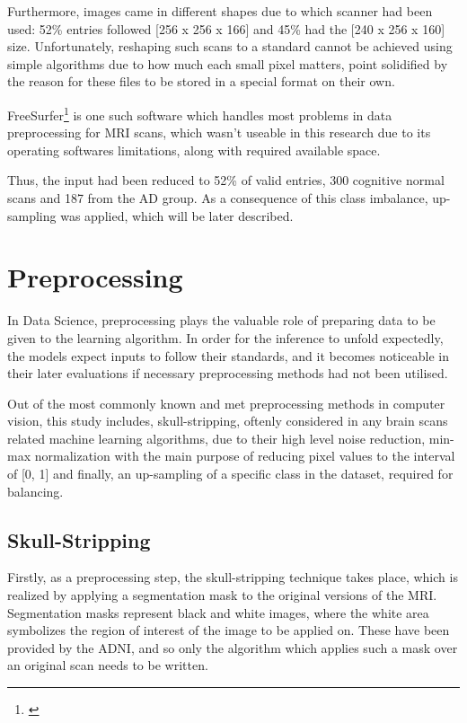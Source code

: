 \documentclass[a4paper, 12pt]{article}
\begin{document}
Furthermore, images came in different shapes
due to which scanner had been used: 52\% entries followed [256 x 256 x 166] and 45\% had the [240 x 256 x 160] size.
Unfortunately, reshaping such scans to a standard cannot be achieved using simple algorithms due to how much each small
pixel matters, point solidified by the reason for these files to be stored in a special format on their own.

FreeSurfer\footnote{\cite{FreeSurfer}} is one such software which handles most problems in data preprocessing for MRI scans, which wasn't
useable in this research due to its operating softwares limitations, along with required available space.

Thus, the input had been reduced to 52\% of valid entries, 300 cognitive normal scans and 187 from the AD group. As a consequence
of this class imbalance, up-sampling was applied, which will be later described.

\newpage
\section{Preprocessing}
In Data Science, preprocessing plays the valuable role of preparing data to be given to the learning algorithm. In order for
the inference to unfold expectedly, the models expect inputs to follow their standards, and it becomes noticeable in their later
evaluations if necessary preprocessing methods had not been utilised.

Out of the most commonly known and met preprocessing methods in computer vision, this study includes, skull-stripping, oftenly
considered in any brain scans related machine learning algorithms, due to their high level noise reduction, min-max normalization
with the main purpose of reducing pixel values to the interval of [0, 1] and finally, an up-sampling of a specific class in the
dataset, required for balancing.

\subsection{Skull-Stripping}

Firstly, as a preprocessing step, the skull-stripping technique takes place, which is realized by applying a segmentation mask
to the original versions of the MRI. Segmentation masks represent black and white images, where the white area symbolizes
the region of interest of the image to be applied on. These have been provided by the ADNI, and so only the algorithm
which applies such a mask over an original scan needs to be written.
\end{document}
